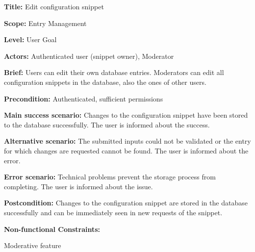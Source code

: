 
\begin{DoxyItemize}
\item {\bfseries{Title\+:}} Edit configuration snippet
\item {\bfseries{Scope\+:}} Entry Management
\item {\bfseries{Level\+:}} User Goal
\item {\bfseries{Actors\+:}} Authenticated user (snippet owner), Moderator
\item {\bfseries{Brief\+:}} Users can edit their own database entries. Moderators can edit all configuration snippets in the database, also the ones of other users.
\end{DoxyItemize}


\begin{DoxyItemize}
\item {\bfseries{Precondition\+:}} Authenticated, sufficient permissions
\item {\bfseries{Main success scenario\+:}} Changes to the configuration snippet have been stored to the database successfully. The user is informed about the success.
\item {\bfseries{Alternative scenario\+:}} The submitted inputs could not be validated or the entry for which changes are requested cannot be found. The user is informed about the error.
\item {\bfseries{Error scenario\+:}} Technical problems prevent the storage process from completing. The user is informed about the issue.
\item {\bfseries{Postcondition\+:}} Changes to the configuration snippet are stored in the database successfully and can be immediately seen in new requests of the snippet.
\item {\bfseries{Non-\/functional Constraints\+:}}
\begin{DoxyItemize}
\item Moderative feature 
\end{DoxyItemize}
\end{DoxyItemize}
